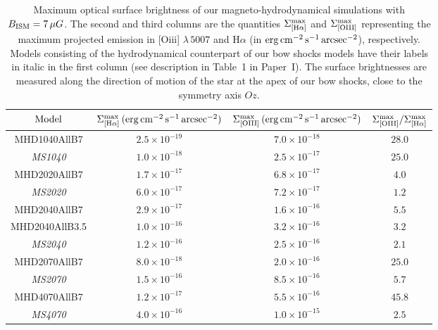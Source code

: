 \documentclass[useAMS,usenatbib]{mn2e}
\begin{document}
\begin{table}
	\centering
	\caption{
	Maximum optical surface brightness of our magneto-hydrodynamical
simulations with $B_{\rm ISM}=7\, \mu G$. The second and third columns are the
quantities $\Sigma_{[\rm H\alpha]}^{\rm max}$ and $\Sigma_{[\rm O{\sc III}]}^{\rm
max}$ representing the maximum projected emission in [O{\sc iii}] $\lambda \,
5007$ and H$\alpha$ (in $\rm erg\, \rm cm^{-2}\, \rm s^{-1}\, \rm arcsec^{-2}$),
respectively. Models consisting of the hydrodynamical counterpart of our bow shocks 
models have their labels in italic in the first column (see description in Table~1 
in Paper~I). The surface brightnesses are measured along the direction of motion of 
the star at the apex of our bow shocks, close to the symmetry axis $Oz$. 
	}
	\begin{tabular}{cccc}
	\hline
	${\rm {Model}}$ &   $\Sigma_{[\rm H\alpha]}^{\rm max}\, (\rm erg\, \rm cm^{-2}\, \rm s^{-1}\, \rm arcsec^{-2})$                              
			&   $\Sigma_{[\rm O{\sc III}]}^{\rm max}\, (\rm erg\, \rm cm^{-2}\, \rm s^{-1}\, \rm arcsec^{-2})$    
			&   $\Sigma_{[\rm O{\sc III}]}^{\rm max}/\Sigma_{[\rm H\alpha]}^{\rm max}$
			\\ \hline   
	MHD1040AllB7    &  $2.5\times 10^{-19}$  &  $7.0\times 10^{-18}$ & $28.0$   \\ 
	{\it MS1040 }   &  $1.0\times 10^{-18}$  &  $2.5\times 10^{-17}$ & $25.0$   \\     		
	MHD2020AllB7    &  $1.7\times 10^{-17}$  &  $6.8\times 10^{-17}$ & $4.0$   \\   
	{\it MS2020 }   &  $6.0\times 10^{-17}$  &  $7.2\times 10^{-17}$ & $1.2$   \\     		
	MHD2040AllB7    &  $2.9\times 10^{-17}$  &  $1.6\times 10^{-16}$ & $5.5$   \\    
	MHD2040AllB3.5  &  $1.0\times 10^{-16}$  &  $3.2\times 10^{-16}$ & $3.2$   \\    	
	{\it MS2040 }   &  $1.2\times 10^{-16}$  &  $2.5\times 10^{-16}$ & $2.1$   \\    
	MHD2070AllB7    &  $8.0\times 10^{-18}$  &  $2.0\times 10^{-16}$ & $25.0$   \\  
	{\it MS2070 }   &  $1.5\times 10^{-16}$  &  $8.5\times 10^{-16}$ & $5.7$   \\  	
	MHD4070AllB7    &  $1.2\times 10^{-17}$  &  $5.5\times 10^{-16}$ & $45.8$   \\   
	{\it MS4070 }   &  $4.0\times 10^{-16}$  &  $1.0\times 10^{-15}$ & $2.5$   \\     			
	\hline    
	\end{tabular}
\label{tab:sigma}
\end{table}
\end{document}

